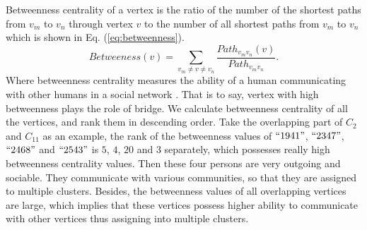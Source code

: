 Betweenness centrality of a vertex is the ratio of the number of the shortest paths from $v_m$ to $v_n$ through vertex $v$ to the number of all shortest paths from $v_m$ to $v_n$ which is shown in Eq. (\ref{eq:betweenness}).
\begin{equation}
Betweeness(v)= \sum_{v_m\neq v\neq v_n}\frac{Path_{v_mv_n}(v)}{Path_{v_mv_n}}.
\label{eq:betweenness}
\end{equation}
Where betweenness centrality measures the ability of a human communicating with other humans in a social network \cite{betweeness}. That is to say, vertex with high betweenness plays the role of bridge. We calculate betweenness centrality of all the vertices, and rank them in descending order. Take the overlapping part of $C_2$ and $C_{11}$ as an example, the rank of the betweenness values of $``1941"$, $``2347"$, $``2468"$ and $``2543"$ is $5$, $4$, $20$ and $3$ separately, which possesses really high betweenness centrality values. Then these four persons are very outgoing and sociable. They communicate with various communities, so that they are assigned to multiple clusters. Besides, the betweenness values of all overlapping vertices are large, which implies that these vertices possess higher ability to communicate with other vertices thus assigning into multiple clusters.



